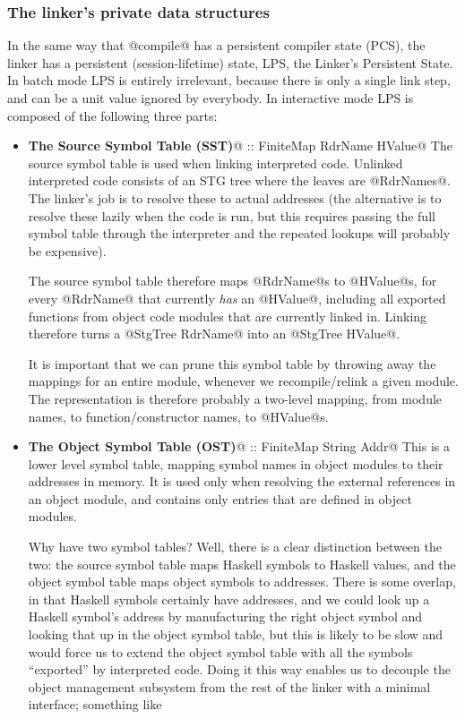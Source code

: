 \documentclass[11pt]{article}
\begin{document}
\subsubsection{The linker's private data structures}

In the same way that @compile@ has a persistent compiler state (PCS),
the linker has a persistent (session-lifetime) state, LPS, the
Linker's Persistent State.  In batch mode LPS is entirely irrelevant,
because there is only a single link step, and can be a unit value
ignored by everybody.  In interactive mode LPS is composed of the
following three parts:

\begin{itemize}
\item 
\textbf{The Source Symbol Table (SST)}@ :: FiniteMap RdrName HValue@   
  The source symbol table is used when linking interpreted code.
  Unlinked interpreted code consists of an STG  tree where
  the leaves are @RdrNames@.  The linker's job is to resolve these to
  actual addresses (the alternative is to resolve these lazily when
  the code is run, but this requires passing the full symbol table
  through the interpreter and the repeated lookups will probably be
  expensive).

  The source symbol table therefore maps @RdrName@s to @HValue@s, for
  every @RdrName@ that currently \emph{has} an @HValue@, including all
  exported functions from object code modules that are currently
  linked in.  Linking therefore turns a @StgTree RdrName@ into an
  @StgTree HValue@.

  It is important that we can prune this symbol table by throwing away
  the mappings for an entire module, whenever we recompile/relink a
  given module.  The representation is therefore probably a two-level
  mapping, from module names, to function/constructor names, to
  @HValue@s.

\item \textbf{The Object Symbol Table (OST)}@ :: FiniteMap String Addr@
  This is a lower level symbol table, mapping symbol names in object
  modules to their addresses in memory.  It is used only when
  resolving the external references in an object module, and contains
  only entries that are defined in object modules.

  Why have two symbol tables?  Well, there is a clear distinction
  between the two: the source symbol table maps Haskell symbols to
  Haskell values, and the object symbol table maps object symbols to
  addresses.  There is some overlap, in that Haskell symbols certainly
  have addresses, and we could look up a Haskell symbol's address by
  manufacturing the right object symbol and looking that up in the
  object symbol table, but this is likely to be slow and would force
  us to extend the object symbol table with all the symbols
  ``exported'' by interpreted code.  Doing it this way enables us to
  decouple the object management subsystem from the rest of the linker
  with a minimal interface; something like


\end{itemize}
\end{document}
